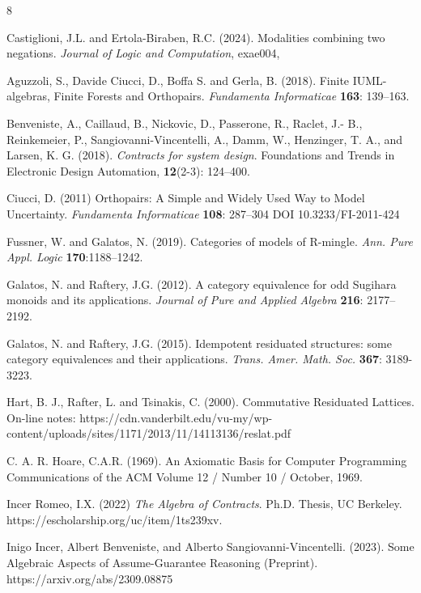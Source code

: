 \documentclass[a4paper,11pt]{article}
\theoremstyle{definition}
\begin{document}
\begin{thebibliography}{8}

 Castiglioni, J.L. and Ertola-Biraben, R.C. (2024). 
Modalities combining two negations. 
\emph{Journal of Logic and Computation}, exae004, 

 Aguzzoli, S., Davide Ciucci, D., Boffa S. and Gerla,  B. (2018).
Finite IUML-algebras, Finite Forests and Orthopairs.
\emph{Fundamenta Informaticae} {\bf{163}}: 139--163.  

 Benveniste, A., Caillaud, B., Nickovic, D., Passerone, R., Raclet, J.-
B., Reinkemeier, P., Sangiovanni-Vincentelli, A., Damm, W., Henzinger, T. A., and
Larsen, K. G. (2018). 
\emph{Contracts for system design}. Foundations and Trends in Electronic Design Automation, {\bf{12}}(2-3): 124--400.

 Ciucci, D. (2011)
Orthopairs: A Simple and Widely Used Way to Model Uncertainty.
\emph{Fundamenta Informaticae} {\bf{108}}: 287--304
DOI 10.3233/FI-2011-424

  Fussner, W. and Galatos, N. (2019).
 Categories of models of R-mingle. 
\emph{Ann. Pure Appl. Logic} {\bf{170}}:1188--1242.

Galatos, N. and  Raftery, J.G. (2012).
A category equivalence for odd Sugihara monoids and its applications. 
{\em{Journal of Pure and Applied Algebra}} {\bf 216}:  2177--2192.

 Galatos, N. and Raftery, J.G. (2015).
Idempotent residuated structures: some category equivalences and their applications. 
\emph{Trans. Amer. Math. Soc.} {\bf{367}}: 3189-3223.

Hart, B. J., Rafter, L. and Tsinakis, C. (2000).
Commutative Residuated Lattices. 
On-line notes: 
https://cdn.vanderbilt.edu/vu-my/wp-content/uploads/sites/1171/2013/11/14113136/reslat.pdf

C. A. R. Hoare, C.A.R. (1969).
An Axiomatic Basis for Computer Programming
Communications of the ACM Volume 12 / Number 10 / October, 1969.

Incer Romeo, I.X. (2022) 
\textit{The Algebra of Contracts}. Ph.D. Thesis, UC Berkeley. 
https://escholarship.org/uc/item/1ts239xv.

Inigo Incer, Albert Benveniste, and Alberto Sangiovanni-Vincentelli. (2023).
Some Algebraic Aspects of Assume-Guarantee Reasoning (Preprint).
{https://arxiv.org/abs/2309.08875}


\end{thebibliography}
\end{document}

